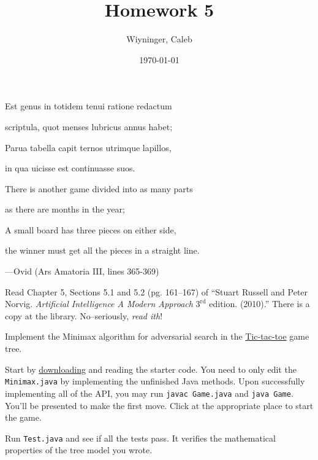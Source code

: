 \documentclass{homework}
\author{Wiyninger, Caleb}
\date{\today}
\title{Homework 5}
\begin{document}
 \maketitle

\begin{minipage}[t]{0.45\textwidth}
  \begin{em}
    Est genus in totidem tenui ratione redactum

    scriptula, quot menses lubricus annus habet;

    Parua tabella capit ternos utrimque lapillos,

    in qua uicisse est continuasse suos.
  \end{em}
\end{minipage}
\begin{minipage}[t]{0.5\textwidth}
  There is another game divided into as many parts

  as there are months in the year;

  A small board has three pieces on either side,

  the winner must get all the pieces in a straight line.
\end{minipage}
\begin{flushright}
  ---Ovid (Ars Amatoria III, lines 365-369)
\end{flushright}

\question Read Chapter 5, Sections 5.1 and 5.2 (pg. 161--167) of
``Stuart Russell and Peter Norvig. \emph{Artificial Intelligence A
  Modern Approach} $3^\text{rd}$ edition. (2010).'' There is a copy at
the library. No--seriously, \emph{read ith}!

\question Implement the Minimax algorithm for adversarial search in the
\href{https://en.wikipedia.org/wiki/Tic-tac-toe}{Tic-tac-toe} game tree.

Start by \href{https://tashfeen.org/s/ds/minimax.zip}{downloading}
and reading the starter code. You need to only edit the
\texttt{Minimax.java} by implementing the unfinished Java
methods. Upon successfully implementing all of the API, you may run
\texttt{javac Game.java} and \texttt{java Game}. You'll be presented
to make the first move.  Click at the appropriate place to start the
game.


Run \texttt{Test.java} and see if all the tests pass. It verifies the
mathematical properties of the tree model you wrote.
\end{document}
